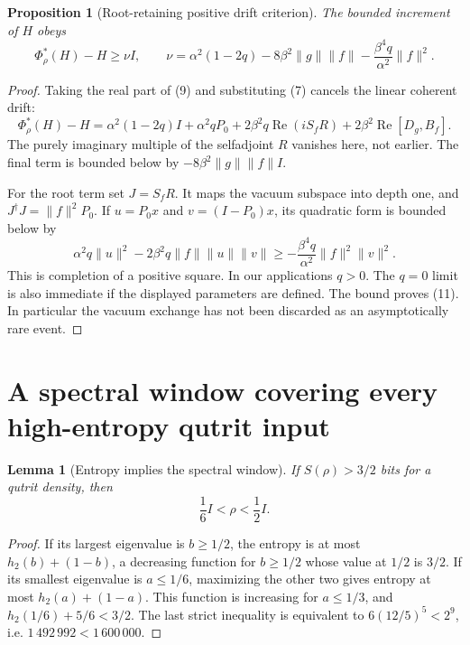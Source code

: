 \documentclass[11pt]{article}
\newtheorem{lemma}[theorem]{Lemma}
\newtheorem{proposition}[theorem]{Proposition}
\newcommand{\Reop}{\operatorname{Re}}
\begin{document}
\begin{proposition}[Root-retaining positive drift criterion]
\label{prop:drift}
The bounded increment of $H$ obeys
\[
 \Phi_\rho^*(H)-H\ge\nu I,\qquad
 \nu=\alpha^2(1-2q)-8\beta^2\|g\|\|f\|
                 -\frac{\beta^4q}{\alpha^2}\|f\|^2.
 \tag{11}
\]
\end{proposition}
\begin{proof}
Taking the real part of (9) and substituting (7) cancels the linear
coherent drift:
\[
 \Phi_\rho^*(H)-H
 =\alpha^2(1-2q)I+\alpha^2qP_0
 +2\beta^2q\Reop(iS_fR)
 +2\beta^2\Reop[D_g,B_f].
 \tag{12}
\]
The purely imaginary multiple of the selfadjoint $R$ vanishes here,
not earlier. The final term is bounded below by
$-8\beta^2\|g\|\|f\|I$.

For the root term set $J=S_fR$. It maps the vacuum subspace into depth
one, and $J^\dagger J=\|f\|^2P_0$. If $u=P_0x$ and
$v=(I-P_0)x$, its quadratic form is bounded below by
\[
 \alpha^2q\|u\|^2-2\beta^2q\|f\|\|u\|\|v\|
 \ge-\frac{\beta^4q}{\alpha^2}\|f\|^2\|v\|^2.
\]
This is completion of a positive square. In our applications $q>0$.
The $q=0$ limit is also immediate if the displayed parameters are defined.
The bound proves (11). In particular the vacuum exchange has not been
discarded as an asymptotically rare event.
\end{proof}

\section{A spectral window covering every high-entropy qutrit input}

\begin{lemma}[Entropy implies the spectral window]
\label{lem:window}
If $S(\rho)>3/2$ bits for a qutrit density, then
\[
 \frac16 I<\rho<\frac12 I.
 \tag{13}
\]
\end{lemma}
\begin{proof}
If its largest eigenvalue is $b\ge1/2$, the entropy is at most
$h_2(b)+(1-b)$, a decreasing function for $b\ge1/2$ whose value
at $1/2$ is $3/2$. If its smallest eigenvalue is $a\le1/6$,
maximizing the other two gives entropy at most $h_2(a)+(1-a)$.
This function is increasing for $a\le1/3$, and
$h_2(1/6)+5/6<3/2$. The last strict inequality is equivalent to
$6(12/5)^5<2^9$, i.e. $1\,492\,992<1\,600\,000$.
\end{proof}
\end{document}
